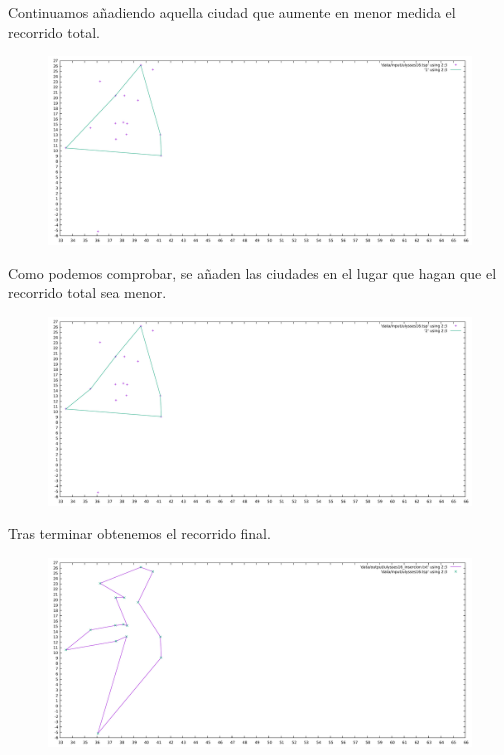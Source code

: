 \documentclass[11pt,a4paper]{article} %
\begin{document}
Continuamos añadiendo aquella ciudad que aumente en menor medida el recorrido total.
\begin{figure}[H]
	\centering
	\includegraphics[width=13cm]{data/graphics/insercion/insercion_2.pdf}
\end{figure}
\vspace{0,7cm}

Como podemos comprobar, se añaden las ciudades en el lugar que hagan que el recorrido total sea menor.
\begin{figure}[H]
	\centering
	\includegraphics[width=13cm]{data/graphics/insercion/insercion_3.pdf}
\end{figure}
\vspace{0,7cm}

Tras terminar obtenemos el recorrido final.
\begin{figure}[H]
	\centering
	\includegraphics[width=13cm]{data/graphics/insercion/insercion_final.pdf}
\end{figure}
\end{document}
